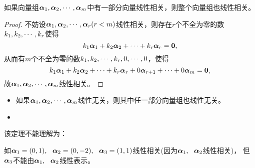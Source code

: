 \begin{frame}
\begin{li}
  如果向量组$\boldsymbol{\alpha}_1,\boldsymbol{\alpha}_2,\cdots,\boldsymbol{\alpha}_m$中有一部分向量线性相关，则整个向量组也线性相关。
\end{li}
\pause 
\begin{proof}
不妨设$\boldsymbol{\alpha}_1,\boldsymbol{\alpha}_2,\cdots,\boldsymbol{\alpha}_r(r<m)$线性相关，则存在$r$个不全为零的数$k_1,k_2,\cdots,k_r$使得
$$
k_1\boldsymbol{\alpha}_1+k_2\boldsymbol{\alpha}_2+\cdots+k_r\boldsymbol{\alpha}_r=\boldsymbol{0},
$$
从而有$m$个不全为零的数$k_1,k_2,\cdots,k_r,0,\cdots,0$，使得
$$
k_1\boldsymbol{\alpha}_1+k_2\boldsymbol{\alpha}_2+\cdots+k_r\boldsymbol{\alpha}_r+0\boldsymbol{\alpha}_{r+1}+\cdots+0\boldsymbol{\alpha}_m=\boldsymbol{0},
$$
故$\boldsymbol{\alpha}_1,\boldsymbol{\alpha}_2,\cdots,\boldsymbol{\alpha}_m$线性相关。
\end{proof}
\end{frame}

\begin{frame}
\begin{zhu*}
  \begin{itemize}
  \item 如果$\boldsymbol{\alpha}_1,\boldsymbol{\alpha}_2,\cdots,\boldsymbol{\alpha}_m$线性无关，则其中任一部分向量组也线性无关。              
  \item     {}
  \end{itemize}
  
\end{zhu*}


\begin{zhu*}
  该定理不能理解为：  

  如$\boldsymbol{\alpha}_1=(0,1), ~~\boldsymbol{\alpha}_2=(0,-2), ~~\boldsymbol{\alpha}_3=(1,1)$线性相关(因为$\boldsymbol{\alpha}_1,~~\boldsymbol{\alpha}_2$线性相关)，
  但$\boldsymbol{\alpha}_3$不能由$\boldsymbol{\alpha}_1,~~\boldsymbol{\alpha}_2$线性表示。 
\end{zhu*}
\end{frame}

